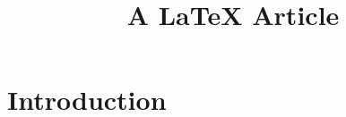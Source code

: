 \documentclass[]{article}
\title{A LaTeX Article}
\author{ ${TM_USERNAME}
\\ Address1
\\ Address2
\\ emails here
\\ http://www.xxx.yyy/mysite.html }
\date{${TM_DATE}}
\newif\ifpdf
\begin{document}
\ifpdf
\DeclareGraphicsExtensions{.pdf, .jpg, .tif}
\else
{}
\fi

\maketitle


\begin{abstract}
\end{abstract}

\section{Introduction}


\end{document}
